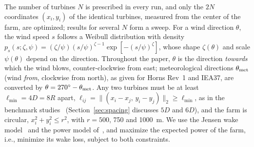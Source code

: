 \documentclass[journal,twoside]{IEEEtran}
\begin{document}
The number of turbines $N$ is prescribed in every run, and only the $2N$ coordinates $(x_i,y_i)$ of the identical turbines, measured from the center of the farm, are optimized; results for several $N$ form a sweep. For a wind direction $\theta$, the wind speed $s$ follows a Weibull distribution with density $p_s(s;\zeta,\psi)=(\zeta/\psi)(s/\psi)^{\zeta-1}\exp[-(s/\psi)^\zeta]$, whose shape $\zeta(\theta)$ and scale $\psi(\theta)$ depend on the direction. Throughout the paper, $\theta$ is the direction \emph{towards} which the wind blows, counter-clockwise from east; meteorological directions $\theta_{\rm met}$ (wind \emph{from}, clockwise from north), as given for Horns Rev~1 and IEA37, are converted by $\theta=270^\circ-\theta_{\rm met}$. Any two turbines must be at least $\ell_{\min}=4D=8R$ apart, $\ell_{ij}=\lVert(x_i-x_j,\,y_i-y_j)\rVert_2\ge\ell_{\min}$, as in the benchmark studies~\cite{Kusiak2010,Bansal2017} (Section~\ref{sec:spacing} discusses $5D$ and $6D$), and the farm is circular, $x_i^2+y_i^2\le r^2$, with $r=500$, 750 and 1000~m. We use the Jensen wake model~\cite{Jensen1983,Katic1986} and the power model of~\cite{Kusiak2010}, and maximize the expected power of the farm, i.e., minimize its wake loss, subject to both constraints.
\end{document}
